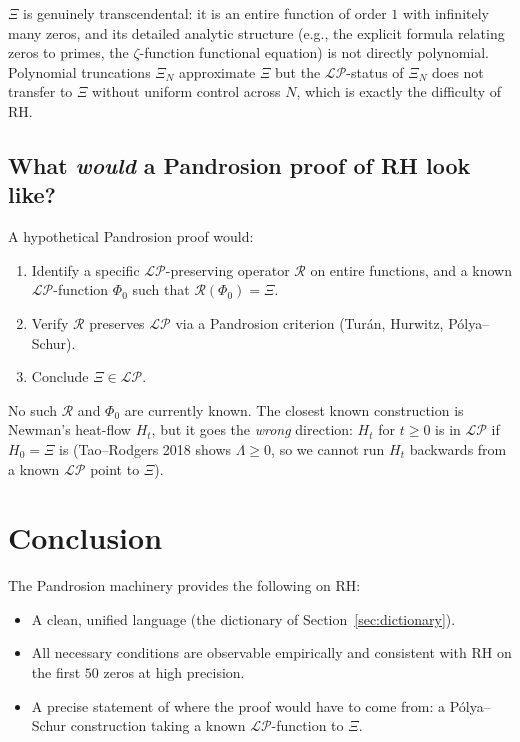 \documentclass[11pt,a4paper]{article}
\begin{document}
$\Xi$ is genuinely transcendental: it is an entire function of order $1$
with infinitely many zeros, and its detailed analytic structure (e.g., the
explicit formula relating zeros to primes, the $\zeta$-function functional
equation) is not directly polynomial. Polynomial truncations $\Xi_N$ approximate
$\Xi$ but the $\mathcal{LP}$-status of $\Xi_N$ does not transfer to $\Xi$
without uniform control across $N$, which is exactly the difficulty of RH.

\subsection{What \emph{would} a Pandrosion proof of RH look like?}

A hypothetical Pandrosion proof would:
\begin{enumerate}
\item Identify a specific $\mathcal{LP}$-preserving operator
$\mathcal{R}$ on entire functions, and a known $\mathcal{LP}$-function
$\Phi_0$ such that $\mathcal{R}(\Phi_0) = \Xi$.
\item Verify $\mathcal{R}$ preserves $\mathcal{LP}$ via a Pandrosion criterion
(Tur\'an, Hurwitz, P\'olya--Schur).
\item Conclude $\Xi \in \mathcal{LP}$.
\end{enumerate}

No such $\mathcal{R}$ and $\Phi_0$ are currently known. The closest known
construction is Newman's heat-flow $H_t$, but it goes the \emph{wrong}
direction: $H_t$ for $t \ge 0$ is in $\mathcal{LP}$ if $H_0 = \Xi$ is
(Tao--Rodgers 2018 shows $\Lambda \ge 0$, so we cannot run $H_t$
backwards from a known $\mathcal{LP}$ point to $\Xi$).

\section{Conclusion}\label{sec:conclusion}

The Pandrosion machinery provides the following on RH:

\begin{itemize}
\item A clean, unified language (the dictionary of Section~\ref{sec:dictionary}).
\item All necessary conditions are observable empirically and consistent with
RH on the first $50$ zeros at high precision.
\item A precise statement of where the proof would have to come from: a P\'olya--Schur
construction taking a known $\mathcal{LP}$-function to $\Xi$.
\end{itemize}
\end{document}
